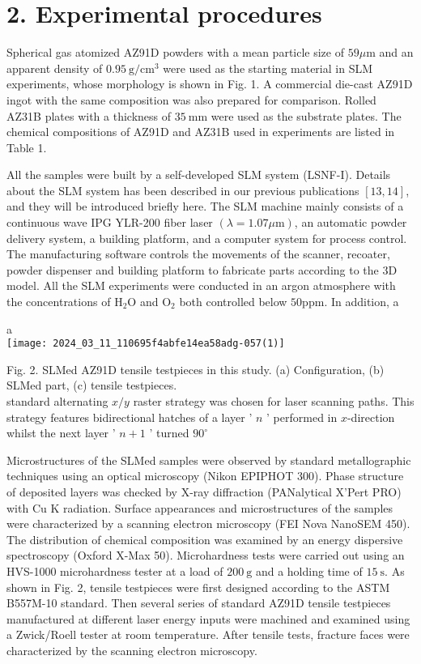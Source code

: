 \documentclass[10pt]{article}
\begin{document}
\section*{2. Experimental procedures}
Spherical gas atomized AZ91D powders with a mean particle size of $59 \mu \mathrm{m}$ and an apparent density of $0.95 \mathrm{~g} / \mathrm{cm}^{3}$ were used as the starting material in SLM experiments, whose morphology is shown in Fig. 1. A commercial die-cast AZ91D ingot with the same composition was also prepared for comparison. Rolled AZ31B plates with a thickness of $35 \mathrm{~mm}$ were used as the substrate plates. The chemical compositions of AZ91D and AZ31B used in experiments are listed in Table 1.

All the samples were built by a self-developed SLM system (LSNF-I). Details about the SLM system has been described in our previous publications $[13,14]$, and they will be introduced briefly here. The SLM machine mainly consists of a continuous wave IPG YLR-200 fiber laser $(\lambda=1.07 \mu \mathrm{m})$, an automatic powder delivery system, a building platform, and a computer system for process control. The manufacturing software controls the movements of the scanner, recoater, powder dispenser and building platform to fabricate parts according to the 3D model. All the SLM experiments were conducted in an argon atmosphere with the concentrations of $\mathrm{H}_{2} \mathrm{O}$ and $\mathrm{O}_{2}$ both controlled below $50 \mathrm{ppm}$. In addition, a

a\\
\texttt{[image: 2024\_03\_11\_110695f4abfe14ea58adg-057(1)]}

Fig. 2. SLMed AZ91D tensile testpieces in this study. (a) Configuration, (b) SLMed part, (c) tensile testpieces.\\
standard alternating $x / y$ raster strategy was chosen for laser scanning paths. This strategy features bidirectional hatches of a layer ' $n$ ' performed in $x$-direction whilst the next layer ' $n+1$ ' turned $90^{\circ}$

Microstructures of the SLMed samples were observed by standard metallographic techniques using an optical microscopy (Nikon EPIPHOT 300). Phase structure of deposited layers was checked by X-ray diffraction (PANalytical X'Pert PRO) with Cu K radiation. Surface appearances and microstructures of the samples were characterized by a scanning electron microscopy (FEI Nova NanoSEM 450). The distribution of chemical composition was examined by an energy dispersive spectroscopy (Oxford X-Max 50). Microhardness tests were carried out using an HVS-1000 microhardness tester at a load of $200 \mathrm{~g}$ and a holding time of $15 \mathrm{~s}$. As shown in Fig. 2, tensile testpieces were first designed according to the ASTM B557M-10 standard. Then several series of standard AZ91D tensile testpieces manufactured at different laser energy inputs were machined and examined using a Zwick/Roell tester at room temperature. After tensile tests, fracture faces were characterized by the scanning electron microscopy.
\end{document}
